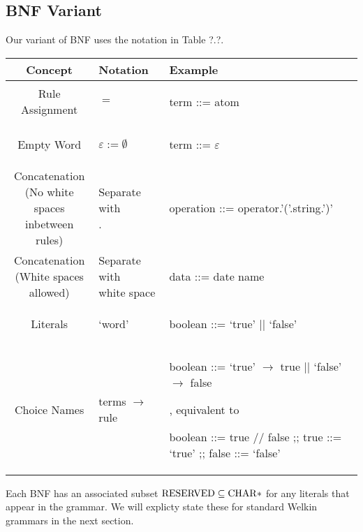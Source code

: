 \subsection{BNF Variant}
Our variant of BNF uses the notation in Table ?.?.
\begin{center}
  \begin{tabular}{ | c | p{2cm} | p{6cm} | }
  \hline
  \textbf{Concept} & \textbf{Notation} & \textbf{Example} \\
  \hline
	Rule Assignment & $=$ & \begin{bnf} term ::= atom\end{bnf}\\
  \hline
  Empty Word & $\varepsilon := \emptyset$ & \begin{bnf} term ::= $\varepsilon$ \end{bnf} \\
  \hline
  \makecell{Concatenation \\ (No white spaces \\ inbetween rules)} & \makecell{Separate with \\ .}&  \begin{bnf} operation ::= operator.'('.string.')'\end{bnf} \\
  \hline
  \makecell{Concatenation \\ (White spaces \\ allowed)} & \makecell{Separate with \\ white space} & \begin{bnf} data ::= date name\end{bnf} \\
    \hline
    Literals & `word' & \begin{bnf} boolean ::= `true' || `false' \end{bnf} \\
    \hline
  Choice Names & terms $\to$ rule & \makecell{\begin{bnf} boolean ::= `true' $\to$ true || `false' $\to$ false \end{bnf}, \\ equivalent to \\ \begin{bnf}  boolean ::= true // false ;; true ::= `true' ;; false ::= `false' \end{bnf}} \\
    \hline
\end{tabular}
\end{center}
Each BNF has an associated subset $\mathrm{RESERVED} \subseteq \mathrm{CHAR}*$ for any literals that appear in the grammar. We will explicty state these for standard Welkin grammars in the next section.

